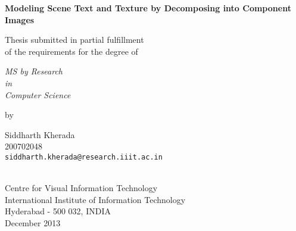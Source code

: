 \thispagestyle{empty}
\begin{center}
\vspace*{1.5cm}
{\Large \bf Modeling Scene Text and Texture by Decomposing into Component Images}

\vspace*{3.75cm}
{\large Thesis submitted in partial fulfillment\\}
{\large  of the requirements for the degree of \\}

\vspace*{1cm}
{\it {\large MS by Research} \\
{\large in\\}
{\large Computer Science\\}}

\vspace*{1cm}
{\large by}

\vspace*{5mm}
{\large Siddharth Kherada\\}
{\large 200702048\\
{\small \tt siddharth.kherada@research.iiit.ac.in}}


\vspace*{4.0cm}
{\\}
{\large Centre for Visual Information Technology\\}
{\large International Institute of Information Technology\\}
{\large Hyderabad - 500 032, INDIA\\}
{\large December 2013\\}
\end{center}